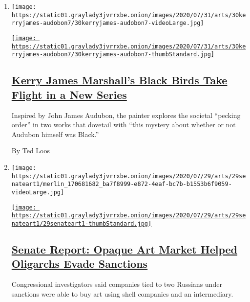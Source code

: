 \begin{enumerate}
\def\labelenumi{\arabic{enumi}.}
\item
  \texttt{[image: https://static01.graylady3jvrrxbe.onion/images/2020/07/31/arts/30kerryjames-audobon7/30kerryjames-audobon7-videoLarge.jpg]}

  \href{/2020/07/29/arts/design/kerry-james-marshall-audubon.html}{\texttt{[image: https://static01.graylady3jvrrxbe.onion/images/2020/07/31/arts/30kerryjames-audobon7/30kerryjames-audobon7-thumbStandard.jpg]}}

  \hypertarget{kerry-james-marshalls-black-birds-take-flight-in-a-new-series}{%
  \subsection{\texorpdfstring{\href{/2020/07/29/arts/design/kerry-james-marshall-audubon.html}{Kerry
  James Marshall's Black Birds Take Flight in a New
  Series}}{Kerry James Marshall's Black Birds Take Flight in a New Series}}\label{kerry-james-marshalls-black-birds-take-flight-in-a-new-series}}

  Inspired by John James Audubon, the painter explores the societal
  ``pecking order'' in two works that dovetail with ``this mystery about
  whether or not Audubon himself was Black.''

  By Ted Loos
\item
  \texttt{[image: https://static01.graylady3jvrrxbe.onion/images/2020/07/29/arts/29senateart1/merlin\_170681682\_ba7f8999-e872-4eaf-bc7b-b1553b6f9059-videoLarge.jpg]}

  \href{/2020/07/29/arts/design/senate-report-art-market-russia-oligarchs-sanctions.html}{\texttt{[image: https://static01.graylady3jvrrxbe.onion/images/2020/07/29/arts/29senateart1/29senateart1-thumbStandard.jpg]}}

  \hypertarget{senate-report-opaque-art-market-helped-oligarchs-evade-sanctions}{%
  \subsection{\texorpdfstring{\href{/2020/07/29/arts/design/senate-report-art-market-russia-oligarchs-sanctions.html}{Senate
  Report: Opaque Art Market Helped Oligarchs Evade
  Sanctions}}{Senate Report: Opaque Art Market Helped Oligarchs Evade Sanctions}}\label{senate-report-opaque-art-market-helped-oligarchs-evade-sanctions}}

  Congressional investigators said companies tied to two Russians under
  sanctions were able to buy art using shell companies and an
  intermediary.


\end{enumerate}
